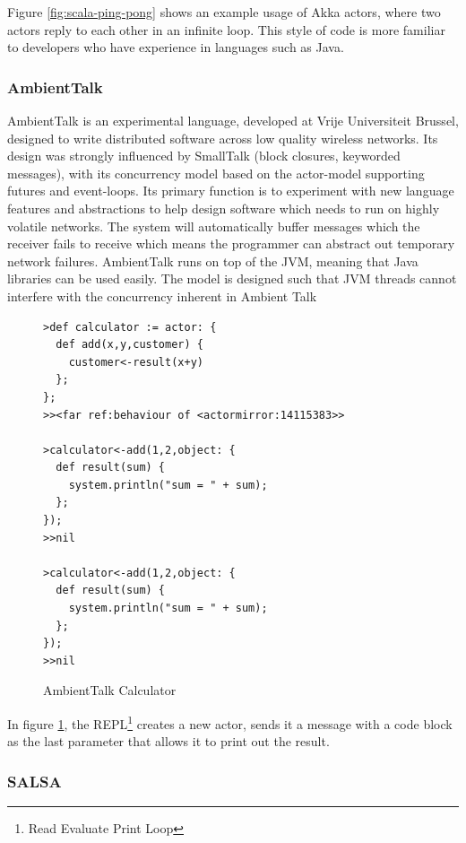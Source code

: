 \documentclass[pdftex,12pt,a4paper]{article}
\begin{document}
Figure \ref{fig:scala-ping-pong} shows an example usage of Akka actors, where two actors reply to each other in an infinite loop.
This style of code is more familiar to developers who have experience in languages such as Java.

\subsubsection{AmbientTalk}
\label{sec:ambienttalk}

AmbientTalk is an experimental language, developed at Vrije Universiteit Brussel, designed to write distributed software across low quality wireless networks.
Its design was strongly influenced by SmallTalk (block closures, keyworded messages), with its concurrency model based on the actor-model supporting futures and event-loops.
Its primary function is to experiment with new language features and abstractions to help design software which needs to run on highly volatile networks.
The system will automatically buffer messages which the receiver fails to receive which means the programmer can abstract out temporary network failures\cite{ambienttalk-failure}.
AmbientTalk runs on top of the JVM, meaning that Java libraries can be used easily.
The model is designed such that JVM threads cannot interfere with the concurrency inherent in Ambient Talk\cite{ambienttalk-interfere}

\begin{figure}[H]
\begin{verbatim}
>def calculator := actor: {
  def add(x,y,customer) {
    customer<-result(x+y)
  };
};
>><far ref:behaviour of <actormirror:14115383>>

>calculator<-add(1,2,object: {
  def result(sum) {
    system.println("sum = " + sum);
  };
});
>>nil

>calculator<-add(1,2,object: {
  def result(sum) {
    system.println("sum = " + sum);
  };
});
>>nil
\end{verbatim}
\caption{AmbientTalk Calculator\cite{ambienttalk-example}}
\label{fig:ambienttalk-calc}
\end{figure}

In figure \ref{fig:ambienttalk-calc}, the REPL\footnote{Read Evaluate Print Loop} creates a new actor, sends it a message with a code block as the last parameter that allows it to print out the result.

\subsubsection{SALSA}
\end{document}
